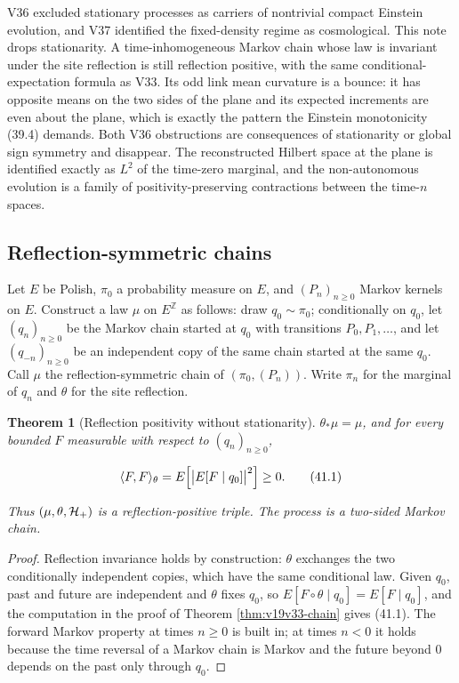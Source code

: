 \documentclass[11pt]{article}
\newtheorem{theorem}{Theorem}[section]
\theoremstyle{remark}
\begin{document}
V36 excluded stationary processes as carriers of nontrivial compact
Einstein evolution, and V37 identified the fixed-density regime as
cosmological.  This note drops stationarity.  A time-inhomogeneous
Markov chain whose law is invariant under the site reflection is still
reflection positive, with the same conditional-expectation formula as
V33.  Its odd link mean curvature is a bounce: it has opposite means on
the two sides of the plane and its expected increments are even about
the plane, which is exactly the pattern the Einstein monotonicity
(39.4) demands.  Both V36 obstructions are consequences of stationarity
or global sign symmetry and disappear.  The reconstructed Hilbert space
at the plane is identified exactly as \(L^2\) of the time-zero marginal,
and the non-autonomous evolution is a family of positivity-preserving
contractions between the time-\(n\) spaces.

\subsection{Reflection-symmetric chains}

Let \(E\) be Polish, \(\pi_0\) a probability measure on \(E\), and
\((P_n)_{n\geq0}\) Markov kernels on \(E\).  Construct a law \(\mu\) on
\(E^{\mathbb Z}\) as follows: draw \(q_0\sim\pi_0\); conditionally on
\(q_0\), let \((q_n)_{n\geq0}\) be the Markov chain started at \(q_0\)
with transitions \(P_0,P_1,\dots\), and let \((q_{-n})_{n\geq0}\) be an
independent copy of the same chain started at the same \(q_0\).  Call
\(\mu\) the reflection-symmetric chain of \((\pi_0,(P_n))\).  Write
\(\pi_n\) for the marginal of \(q_n\) and \(\theta\) for the site
reflection.

\begin{theorem}[Reflection positivity without stationarity]
\label{thm:v19v38-chain}
\(\theta_*\mu=\mu\), and for every bounded \(F\) measurable with respect
to \((q_n)_{n\geq0}\),

\[
 \langle F,F\rangle_\theta=E\Bigl[\bigl|E[F\mid q_0]\bigr|^2\Bigr]\geq0.
                                                                    \tag{41.1}
\]

Thus \((\mu,\theta,{\cal H}_+)\) is a reflection-positive triple.  The
process is a two-sided Markov chain.
\end{theorem}

\begin{proof}
Reflection invariance holds by construction: \(\theta\) exchanges the two
conditionally independent copies, which have the same conditional law.
Given \(q_0\), past and future are independent and \(\theta\) fixes
\(q_0\), so \(E[F\circ\theta\mid q_0]=E[F\mid q_0]\), and the computation
in the proof of Theorem \ref{thm:v19v33-chain} gives (41.1).  The
forward Markov property at times \(n\geq0\) is built in; at times
\(n<0\) it holds because the time reversal of a Markov chain is Markov
and the future beyond \(0\) depends on the past only through
\(q_0\).
\end{proof}
\end{document}
